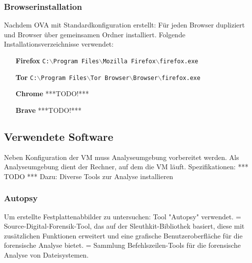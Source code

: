 \subsubsection*{Browserinstallation}
Nachdem OVA mit Standardkonfiguration erstellt: Für jeden Browser dupliziert und Browser über gemeinsamen Ordner installiert. Folgende Installationsverzeichnisse verwendet:
\begin{enumerate}
\item[\textbf{Firefox}] \texttt{C:$\backslash$Program Files$\backslash$Mozilla Firefox$\backslash$firefox.exe}
\item[\textbf{Tor}] \texttt{C:$\backslash$Program Files$\backslash$Tor Browser$\backslash$Browser$\backslash$firefox.exe}
\item[\textbf{Chrome}] ***TODO!***
\item[\textbf{Brave}] ***TODO!***
\end{enumerate}

\subsection*{Verwendete Software}

Neben Konfiguration der VM muss Analyseumgebung vorbereitet werden.
Als Analyseumgebung dient der Rechner, auf dem die VM läuft.
Spezifikationen: *** TODO ***
Dazu: Diverse Tools zur Analyse installieren

\subsubsection*{Autopsy}
Um erstellte Festplattenabbilder zu untersuchen: Tool "Autopsy" verwendet.
= Source-Digital-Forensik-Tool, das auf der Sleuthkit-Bibliothek basiert, diese mit zusätzlichen Funktionen erweitert und eine grafische Benutzeroberfläche für die forensische Analyse bietet.  
= Sammlung Befehlszeilen-Tools für die forensische Analyse von Dateisystemen. 
 

